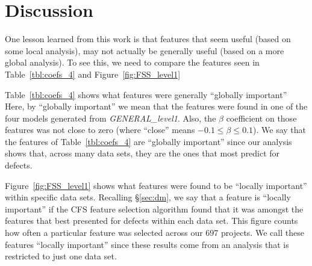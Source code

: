 \documentclass[10pt,journal,compsoc]{IEEEtran}
\newcommand{\fig}[1]{Figure~\ref{fig:#1}}
\begin{document}
\section{Discussion}
\label{sec:rq6}

One lesson learned from this work is that
features that seem useful (based on some local analysis),
may not actually be generally useful
(based on a more global analysis).
To see this, we need to compare the
features seen in
Table~\ref{tbl:coefs_4} and
\fig{FSS_level1}  

  Table~\ref{tbl:coefs_4} 
 shows what  features were generally
 ``globally important'' 
 Here, by ``globally important'' we mean that the features were found in
  one of the four models generated from  {\em GENERAL\_level1}. Also,
  the $\beta$ coefficient on those features was not  close to zero (where ``close'' means $-0.1 \le \beta \le 0.1$).
We   say that the  features  of Table~\ref{tbl:coefs_4}   are ``globally important''
  since our analysis shows that, across many data sets,
  they are the ones that most predict for defects.
  
\fig{FSS_level1} shows what features were found to be ``locally important'' within specific data sets. 
 Recalling \S\ref{sec:dm}, we say that a feature is
 ``locally important'' if the CFS feature selection algorithm found that it was amongst the features
 that best presented for defects within each data set. This figure counts how often a particular feature was selected across our 697 projects. 
 We call these features   ``locally important''
 since these results come from an analysis that is restricted to just one data set.
\end{document}
